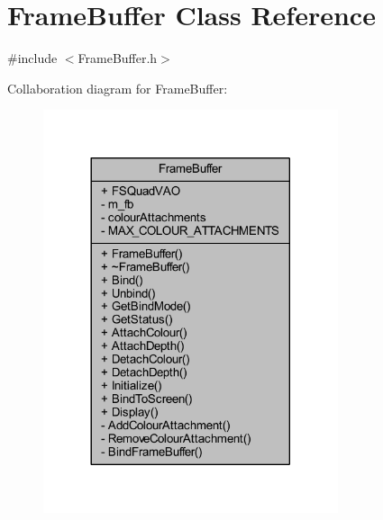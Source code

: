 \hypertarget{class_frame_buffer}{}\section{Frame\+Buffer Class Reference}
\label{class_frame_buffer}


{\ttfamily \#include $<$Frame\+Buffer.\+h$>$}



Collaboration diagram for Frame\+Buffer\+:\nopagebreak
\begin{figure}[H]
\begin{center}
\leavevmode
\includegraphics[width=245pt]{class_frame_buffer__coll__graph}
\end{center}
\end{figure}
